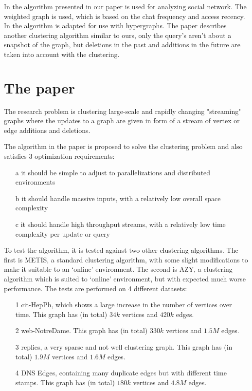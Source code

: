 \documentclass[a4paper,11pt]{article}
\begin{document}
In \cite{DynPar} the algorithm presented in our paper is used for analyzing social network. The weighted graph is used, which is based on the chat frequency and access recency. In \cite{StrHyp} the algorithm is adapted for use with hypergraphs. The paper \cite{ProStr} describes another clustering algorithm similar to ours, only the query's aren't about a snapshot of the graph, but deletions in the past and additions in the future are taken into account with the clustering.


\section{The paper}
The research problem is clustering large-scale and rapidly changing "streaming" graphs where the updates to a graph are given in form of a stream of vertex or edge additions and deletions. 

The algorithm in the paper is proposed to solve the clustering problem and also satisfies 3 optimization requirements:
\begin{itemize}
\item[a] it should be simple to adjust to parallelizations and distributed environments
\item[b] it should handle massive inputs, with a relatively low overall space complexity
\item[c] it should handle high throughput streams, with a relatively low time complexity per update or query
\end{itemize}

To test the algorithm, it is tested against two other clustering algorithms. The first is METIS, a standard clustering algorithm, with some slight modifications to make it suitable to an `online' environment. The second is AZY, a clustering algorithm which is suited to `online' environment, but with expected much worse performance. The tests are performed on 4 different datasets:
\begin{itemize}
\item[1] cit-HepPh, which shows a large increase in the number of vertices over time. This graph has (in total) $34k$ vertices and $420k$ edges.
\item[2] web-NotreDame. This graph has (in total) $330k$ vertices and $1.5M$ edges.
\item[3] replies, a very sparse and not well clustering graph. This graph has (in total) $1.9M$ vertices and $1.6M$ edges.
\item[4] DNS Edges, containing many duplicate edges but with different time stamps. This graph has (in total) $180k$ vertices and $4.8M$ edges.
\end{itemize}
\end{document}
